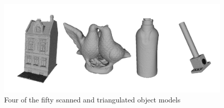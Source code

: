\documentclass[10pt,twocolumn,letterpaper]{article}
\begin{document}
\begin{figure}[ht]
\centering
\includegraphics[width=1.0\linewidth, height= 1.0\linewidth, keepaspectratio]{img/objects/objects.pdf}
\caption{Four of the fifty scanned and triangulated object models}
\label{fig:objects}
\end{figure}
\end{document}
